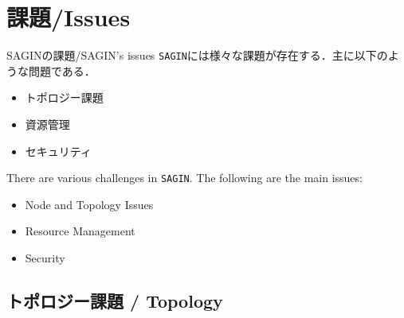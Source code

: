 \documentclass[11pt, aspectratio=169]{beamer}
\begin{document}
\section{課題/Issues}

\begin{frame}{SAGINの課題/SAGIN's issues}
  \texttt{SAGIN}には様々な課題が存在する．主に以下のような問題である．
  \begin{itemize}
    \item トポロジー課題
    \item 資源管理
    \item セキュリティ
  \end{itemize}
  There are various challenges in \texttt{SAGIN}. The following are the main issues:
  \begin{itemize}
    \item Node and Topology Issues
    \item Resource Management
    \item Security
  \end{itemize}
\end{frame}

\subsection{トポロジー課題 / Topology}
\end{document}
